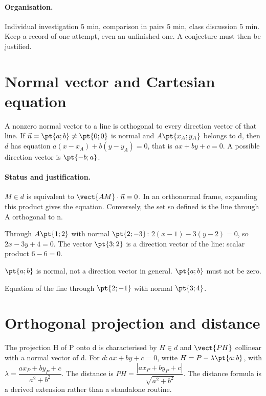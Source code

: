 \paragraph{Organisation.} Individual investigation 5 min, comparison in pairs 5 min, class discussion 5 min. Keep a record of one attempt, even an unfinished one. A conjecture must then be justified.
\mxnewpage
\section{Normal vector and Cartesian equation}\label{C07-U1}
\begin{keypoint}
A nonzero normal vector to a line is orthogonal to every direction vector of that line. If $\vec n=\pt{a;b}\ne\pt{0;0}$ is normal and $A\pt{x_A;y_A}$ belongs to d, then $d$ has equation $a(x-x_A)+b(y-y_A)=0$, that is $ax+by+c=0$. A possible direction vector is $\pt{-b;a}$.
\end{keypoint}
\paragraph{Status and justification.} $M\in d$ is equivalent to $\vect{AM}\cdot\vec n=0$. In an orthonormal frame, expanding this product gives the equation. Conversely, the set so defined is the line through A orthogonal to n.
\begin{example}Through $A\pt{1;2}$ with normal $\pt{2;-3}$: $2(x-1)-3(y-2)=0$, so $2x-3y+4=0$. The vector $\pt{3;2}$ is a direction vector of the line: scalar product $6-6=0$.\end{example}\label{C07-EX1}
\begin{pitfall}$\pt{a;b}$ is normal, not a direction vector in general. $\pt{a;b}$ must not be zero.\end{pitfall}
\begin{application}Equation of the line through $\pt{2;-1}$ with normal $\pt{3;4}$.\end{application}\label{C07-AP1}
\section{Orthogonal projection and distance}\label{C07-U2}
\begin{keypoint}
The projection H of P onto d is characterised by $H\in d$ and $\vect{PH}$ collinear with a normal vector of d. For $d:ax+by+c=0$, write $H=P-\lambda\pt{a;b}$, with $\lambda =\dfrac{ax_P+by_P+c}{a^2+b^2}$. The distance is $PH=\dfrac{|ax_P+by_P+c|}{\sqrt {a^2+b^2}}$. The distance formula is a derived extension rather than a standalone routine.
\end{keypoint}
